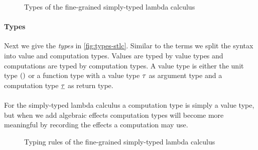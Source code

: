 {\begin{figure}
\caption{Types of the fine-grained simply-typed lambda calculus}
\centering
\fbox{
\begin{minipage}{4 cm}
\begin{align*}
& \ty \Coloneqq \tunit \;|\; \tarr{\ty}{\cty} \\
& \cty \Coloneqq \ty
\end{align*}
\label{fig:types-stlc}
\end{minipage}
}
\end{figure}

\paragraph{Types}
Next we give the \emph{types} in \cref{fig:types-stlc}.
Similar to the terms we split the syntax into value and computation types.
Values are typed by value types and computations are typed by computation types.
A value type is either the unit type $()$ or a function type with a value type $\tau$ as argument type and a computation type  $\underline{\tau}$ as return type.
\\\\
For the simply-typed lambda calculus a computation type is simply a value type, but when we add algebraic effects computation types will become more meaningful by recording the effects a computation may use.

\begin{figure}
\caption{Typing rules of the fine-grained simply-typed lambda calculus}
\centering
{}
\end{figure}

}
